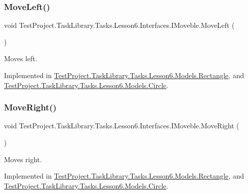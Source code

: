 \subsubsection{\texorpdfstring{MoveLeft()}{MoveLeft()}}
{\footnotesize\ttfamily void Test\+Project.\+Task\+Library.\+Tasks.\+Lesson6.\+Interfaces.\+I\+Moveble.\+Move\+Left (\begin{DoxyParamCaption}{ }\end{DoxyParamCaption})}



Moves left. 



Implemented in \mbox{\hyperlink{class_test_project_1_1_task_library_1_1_tasks_1_1_lesson6_1_1_models_1_1_rectangle_adf5fbf63db1eaf0959ef5e6c9dbdedb2}{Test\+Project.\+Task\+Library.\+Tasks.\+Lesson6.\+Models.\+Rectangle}}, and \mbox{\hyperlink{class_test_project_1_1_task_library_1_1_tasks_1_1_lesson6_1_1_models_1_1_circle_ae827e79380443cdad964c963c3debdc8}{Test\+Project.\+Task\+Library.\+Tasks.\+Lesson6.\+Models.\+Circle}}.

\mbox{\label{interface_test_project_1_1_task_library_1_1_tasks_1_1_lesson6_1_1_interfaces_1_1_i_moveble_a1e6b39ff1e153b383e081f991501e742}} 
\subsubsection{\texorpdfstring{MoveRight()}{MoveRight()}}
{\footnotesize\ttfamily void Test\+Project.\+Task\+Library.\+Tasks.\+Lesson6.\+Interfaces.\+I\+Moveble.\+Move\+Right (\begin{DoxyParamCaption}{ }\end{DoxyParamCaption})}



Moves right. 



Implemented in \mbox{\hyperlink{class_test_project_1_1_task_library_1_1_tasks_1_1_lesson6_1_1_models_1_1_rectangle_a794f5d29886b4dd004db176c553d5597}{Test\+Project.\+Task\+Library.\+Tasks.\+Lesson6.\+Models.\+Rectangle}}, and \mbox{\hyperlink{class_test_project_1_1_task_library_1_1_tasks_1_1_lesson6_1_1_models_1_1_circle_aa5dc626f3077944c63847ca34e808c9c}{Test\+Project.\+Task\+Library.\+Tasks.\+Lesson6.\+Models.\+Circle}}.

